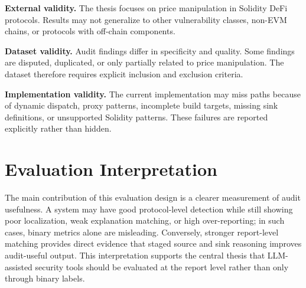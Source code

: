\textbf{External validity.} The thesis focuses on price manipulation in
Solidity DeFi protocols. Results may not generalize to other vulnerability
classes, non-EVM chains, or protocols with off-chain components.

\textbf{Dataset validity.} Audit findings differ in specificity and quality.
Some findings are disputed, duplicated, or only partially related to price
manipulation. The dataset therefore requires explicit inclusion and exclusion
criteria.

\textbf{Implementation validity.} The current implementation may miss paths because of
dynamic dispatch, proxy patterns, incomplete build targets, missing sink
definitions, or unsupported Solidity patterns. These failures are reported
explicitly rather than hidden.

\section{Evaluation Interpretation}

The main contribution of this evaluation design is a clearer measurement of
audit usefulness. A system may have good protocol-level detection while still
showing poor localization, weak explanation matching, or high over-reporting;
in such cases, binary metrics alone are misleading. Conversely, stronger
report-level matching provides direct evidence that staged source and sink
reasoning improves audit-useful output. This interpretation supports the
central thesis that LLM-assisted security tools should be evaluated at the
report level rather than only through binary labels.
